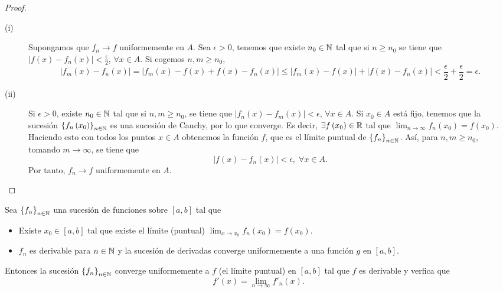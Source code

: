 \begin{proof}
\begin{description}
\item[(i)] Supongamos que $\displaystyle f_{n} \to f $ uniformemente en $\displaystyle A $. Sea $\displaystyle \epsilon > 0 $, tenemos que existe $\displaystyle n_{0} \in \mathbb{N} $ tal que si $\displaystyle n \geq n_{0} $ se tiene que $\displaystyle \left|f\left(x\right)-f_{n}\left(x\right)\right| < \frac{\epsilon }{2} $, $\displaystyle \forall x \in A $. Si cogemos $\displaystyle n,m \geq n_{0} $,
	\[ \left|f_{m}\left(x\right)-f_{n}\left(x\right)\right| = \left|f_{m}\left(x\right)-f\left(x\right)+f\left(x\right)-f_{n}\left(x\right)\right| \leq \left|f_{m}\left(x\right)-f\left(x\right)\right|+ \left|f\left(x\right)-f_{n}\left(x\right)\right| < \frac{\epsilon }{2} + \frac{\epsilon }{2} = \epsilon  .\]
\item[(ii)] Si $\displaystyle \epsilon > 0 $, existe $\displaystyle n_{0} \in \mathbb{N} $ tal que si $\displaystyle n,m \geq n_{0} $, se tiene que $\displaystyle \left|f_{n}\left(x\right)-f_{m}\left(x\right)\right|<\epsilon  $, $\displaystyle \forall x \in A $. Si $\displaystyle x_{0} \in A $ está fijo, tenemos que la sucesión $\displaystyle \left\{ f_{n}\left(x_{0}\right)\right\} _{n\in\mathbb{N}} $ es una sucesión de Cauchy, por lo que converge. Es decir, $\displaystyle \exists f\left(x_{0}\right) \in \mathbb{R} $ tal que $\displaystyle \lim_{n \to \infty}f_{n}\left(x_{0}\right) = f\left(x_{0}\right) $. 
	Haciendo esto con todos los puntos $\displaystyle x \in A $ obtenemos la función $\displaystyle f $, que es el límite puntual de $\displaystyle \left\{ f_{n}\right\} _{n\in\mathbb{N}} $. Así, para $\displaystyle n,m \geq n_{0} $, tomando $\displaystyle m \to \infty $, se tiene que
	\[ \left|f\left(x\right)-f_{n}\left(x\right)\right| < \epsilon, \; \forall x \in A.\]
	Por tanto, $\displaystyle f_{n} \to f $ uniformemente en $\displaystyle A $.
\end{description}
\end{proof}
\begin{ftheorem}[]
	\normalfont Sea $\displaystyle \left\{ f_{n}\right\} _{n\in\mathbb{N}} $ una sucesión de funciones sobre $\displaystyle \left[a,b\right]  $ tal que
	\begin{itemize}
	\item Existe $\displaystyle x_{0} \in \left[a,b\right]  $ tal que existe el límite (puntual) $\displaystyle \lim_{x \to x_{0}}f_{n}\left(x_{0}\right) = f\left(x_{0}\right) $.
\item $\displaystyle f_{n} $ es derivable para $\displaystyle  n \in \mathbb{N} $ y la sucesión de derivadas converge uniformemente a una función $\displaystyle g $ en $\displaystyle \left[a,b\right]  $.
	\end{itemize}
	Entonces la sucesión $\displaystyle \left\{ f_{n}\right\} _{n\in\mathbb{N}} $ converge uniformemente a $\displaystyle f $ (el límite puntual) en $\displaystyle \left[a,b\right]  $ tal que $\displaystyle f $ es derivable y verfica que 
	\[ f'\left(x\right) = \lim_{n \to \infty}f'_{n}\left(x\right).\]
\end{ftheorem}
